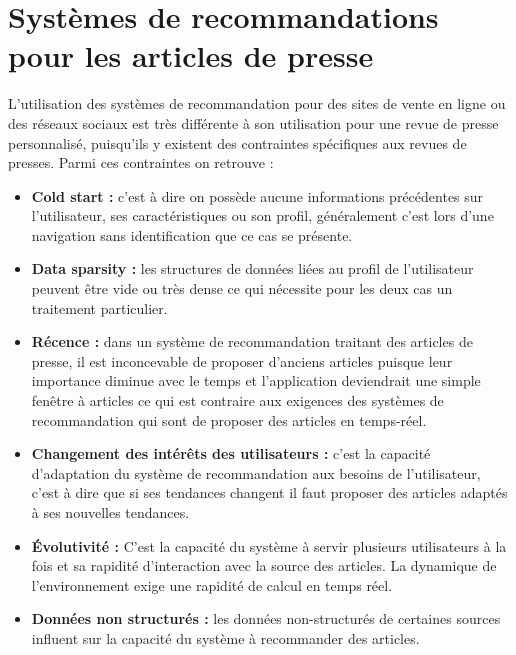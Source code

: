 \section{Systèmes de recommandations pour les articles de presse}
L'utilisation des systèmes de recommandation pour des sites de vente en ligne ou des réseaux sociaux est très différente à son utilisation pour une revue de presse personnalisé, puisqu'ils y existent des contraintes spécifiques aux revues de presses.
Parmi ces contraintes on retrouve :
\begin{itemize}
    \item \textbf{Cold start : }c'est à dire on possède aucune informations précédentes sur l'utilisateur, ses caractéristiques ou son profil, généralement c'est lors d'une navigation sans identification que ce cas se présente.\\
    \item \textbf{Data sparsity : }les structures de données liées au profil de l'utilisateur peuvent être vide ou très dense ce qui nécessite pour les deux cas un traitement particulier.\\
    \item \textbf{Récence : }dans un système de recommandation traitant des articles de presse, il est inconcevable de proposer d'anciens articles puisque leur importance diminue avec le temps et l'application deviendrait une simple fenêtre à articles ce qui est contraire aux exigences des systèmes de recommandation qui sont de proposer des articles en temps-réel.\\
    \item \textbf{Changement des intérêts des utilisateurs : }c'est la capacité d'adaptation du système de recommandation aux besoins de l'utilisateur, c'est à dire que si ses tendances changent il faut proposer des articles adaptés à ses nouvelles tendances.\\
    \item \textbf{Évolutivité : }C'est la capacité du système à servir plusieurs utilisateurs à la fois et sa rapidité d'interaction avec la source des articles. La dynamique de l'environnement exige une rapidité de calcul en temps réel.\\ 
    \item \textbf{Données non structurés : }les données non-structurés de certaines sources influent sur la capacité du système à recommander des articles.\\
\end{itemize}

